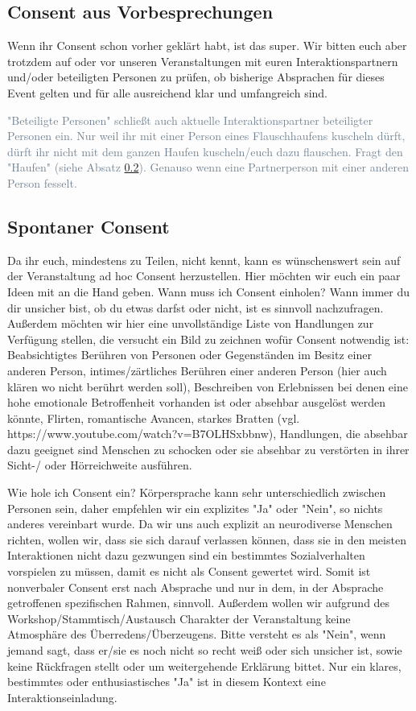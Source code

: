 \documentclass{article}
\begin{document}
\subsection{Consent aus Vorbesprechungen}
Wenn ihr Consent schon vorher geklärt habt, ist das super. Wir bitten euch aber trotzdem auf oder vor unseren Veranstaltungen mit euren Interaktionspartnern und/oder beteiligten Personen zu prüfen, ob bisherige Absprachen für dieses Event gelten und für alle ausreichend klar und umfangreich sind. 

\begingroup{}
\textcolor{SlateGrey}{"Beteiligte Personen" schließt auch aktuelle Interaktionspartner beteiligter Personen ein. Nur weil ihr mit einer Person eines Flauschhaufens kuscheln dürft, dürft ihr nicht mit dem ganzen Haufen kuscheln/euch dazu flauschen. Fragt den "Haufen" (siehe Absatz \ref{sponcon}). Genauso wenn eine Partnerperson mit einer anderen Person fesselt.}

\endgroup

\subsection{Spontaner Consent}
\label{sponcon}
Da ihr euch, mindestens zu Teilen, nicht kennt, kann es wünschenswert sein auf der Veranstaltung ad hoc Consent herzustellen. Hier möchten wir euch ein paar Ideen mit an die Hand geben. Wann muss ich Consent einholen? Wann immer du dir unsicher bist, ob du etwas darfst oder nicht, ist es sinnvoll nachzufragen. Außerdem möchten wir hier eine unvollständige Liste von Handlungen zur Verfügung stellen, die versucht ein Bild zu zeichnen wofür Consent notwendig ist:
Beabsichtigtes Berühren von Personen oder Gegenständen im Besitz einer anderen Person, intimes/zärtliches Berühren einer anderen Person (hier auch klären wo nicht berührt werden soll), Beschreiben von Erlebnissen bei denen eine hohe emotionale Betroffenheit vorhanden ist oder absehbar ausgelöst werden könnte, Flirten, romantische Avancen, starkes Bratten (vgl. https://www.youtube.com/watch?v=B7OLHSxbbnw), Handlungen, die absehbar dazu geeignet sind Menschen zu schocken oder sie absehbar zu verstörten in ihrer Sicht-/ oder Hörreichweite ausführen.


Wie hole ich Consent ein? Körpersprache kann sehr unterschiedlich zwischen Personen sein, daher empfehlen wir ein explizites "Ja" oder "Nein", so nichts anderes vereinbart wurde. Da wir uns auch explizit an neurodiverse Menschen richten, wollen wir, dass sie sich darauf verlassen können, dass sie in den meisten Interaktionen nicht dazu gezwungen sind ein bestimmtes Sozialverhalten vorspielen zu müssen, damit es nicht als Consent gewertet wird. Somit ist nonverbaler Consent erst nach Absprache und nur in dem, in der Absprache getroffenen spezifischen Rahmen, sinnvoll. Außerdem wollen wir aufgrund des Workshop/Stammtisch/Austausch Charakter der Veranstaltung keine Atmosphäre des Überredens/Überzeugens. Bitte versteht es als "Nein", wenn jemand sagt, dass er/sie es noch nicht so recht weiß oder sich unsicher ist, sowie keine Rückfragen stellt oder um weitergehende Erklärung bittet. Nur ein klares, bestimmtes oder enthusiastisches "Ja" ist in diesem Kontext eine Interaktionseinladung.
\end{document}
